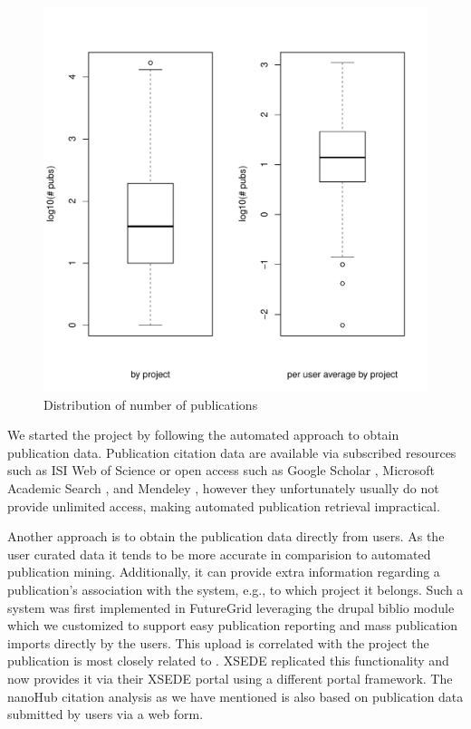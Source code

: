 \documentclass{sig-alternate}
\begin{document}
\begin{figure}[!htb] 
  \centering 
    \includegraphics[width=1.0\columnwidth]{images/01_dist_npubs_proj.pdf} 
  \caption{Distribution of number of publications}\label{F:dist-npubs-proj} 
\end{figure} 
 

We started the project by following the automated approach to obtain publication data. Publication citation data are available via subscribed resources such as ISI Web of Science \cite{www-isiwos} or open access such as Google Scholar \cite{www-googlescholar}, Microsoft Academic Search \cite{www-msas}, and Mendeley \cite{www-mendeley}, however they unfortunately usually do not provide unlimited access, making automated publication retrieval impractical. 
 
Another approach is to obtain the publication data directly from users. As the user curated data it tends to be more accurate in comparision to automated publication mining. Additionally, it can provide extra information regarding a publication's association with the system, e.g., to which project it belongs. 
Such a system was first implemented in FutureGrid leveraging the drupal biblio module \cite{www-drupal-bib} which we customized to support easy publication reporting and mass publication imports directly by the users. This upload is correlated with the project the publication is most closely related to \cite{www-fgbiblio}. XSEDE replicated this functionality and now provides it via their XSEDE portal \cite{www-xdportalpub} using a different portal framework. The nanoHub citation analysis \cite{www-nanohubcite} as we have mentioned is also based on publication data submitted by users via a web form. 
 
\end{document}
